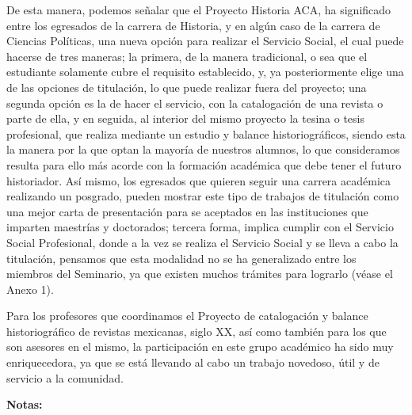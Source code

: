 De esta manera, podemos señalar que el Proyecto Historia ACA, ha significado
entre los egresados de la carrera de Historia, y en algún caso de la
carrera de Ciencias Políticas, una nueva opción para realizar el Servicio
Social, el cual puede hacerse de tres maneras; la primera, de la manera
tradicional, o sea que el estudiante solamente cubre el requisito
establecido, y, ya posteriormente elige una de las opciones de titulación,
lo que puede realizar fuera del proyecto; una segunda opción es la de hacer
el servicio, con la catalogación de una revista o parte de ella,  y en
seguida, al interior del mismo proyecto la tesina o tesis profesional, que
realiza mediante un estudio y balance historiográficos, siendo esta la
manera por la que optan la mayoría de nuestros alumnos, lo que consideramos
resulta para ello más acorde con la formación académica que debe tener el
futuro historiador. Así mismo, los egresados que quieren seguir una carrera
académica realizando un posgrado, pueden mostrar este tipo de trabajos de
titulación como una mejor carta de presentación para se aceptados en las
instituciones que imparten maestrías y doctorados;  tercera forma, implica
cumplir con el Servicio Social Profesional, donde a la vez se realiza el
Servicio Social y se lleva a cabo la titulación, pensamos que esta
modalidad no se ha generalizado entre los miembros del Seminario, ya que
existen muchos trámites para lograrlo (véase el Anexo 1).

Para los profesores que coordinamos el Proyecto de catalogación y balance
historiográfico de revistas mexicanas, siglo XX, así como también para los
que son asesores en el mismo, la participación en este grupo académico ha
sido muy enriquecedora, ya que se está llevando al cabo un trabajo
novedoso, útil y de servicio a la comunidad.

\bigskip
\textbf{Notas:}

